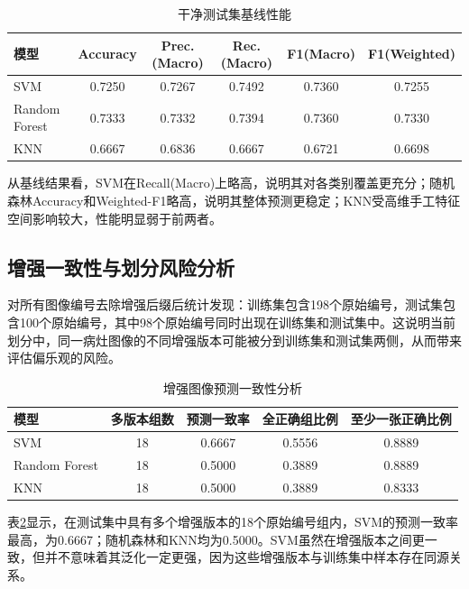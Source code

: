 \documentclass[12pt,a4paper]{ctexart}
\begin{document}
\begin{table}[H]
\centering
\caption{干净测试集基线性能}
\label{tab:baseline}
\begin{tabular}{lccccc}
\toprule
\textbf{模型} & \textbf{Accuracy} & \textbf{Prec.(Macro)} & \textbf{Rec.(Macro)} & \textbf{F1(Macro)} & \textbf{F1(Weighted)} \\
\midrule
SVM           & 0.7250 & 0.7267 & 0.7492 & 0.7360 & 0.7255 \\
Random Forest & 0.7333 & 0.7332 & 0.7394 & 0.7360 & 0.7330 \\
KNN           & 0.6667 & 0.6836 & 0.6667 & 0.6721 & 0.6698 \\
\bottomrule
\end{tabular}
\end{table}

从基线结果看，SVM在Recall(Macro)上略高，说明其对各类别覆盖更充分；随机森林Accuracy和Weighted-F1略高，说明其整体预测更稳定；KNN受高维手工特征空间影响较大，性能明显弱于前两者。

\subsection{增强一致性与划分风险分析}
对所有图像编号去除增强后缀后统计发现：训练集包含198个原始编号，测试集包含100个原始编号，其中98个原始编号同时出现在训练集和测试集中。这说明当前划分中，同一病灶图像的不同增强版本可能被分到训练集和测试集两侧，从而带来评估偏乐观的风险。

\begin{table}[H]
\centering
\caption{增强图像预测一致性分析}
\label{tab:aug_consistency}
\begin{tabular}{lcccc}
\toprule
\textbf{模型} & \textbf{多版本组数} & \textbf{预测一致率} & \textbf{全正确组比例} & \textbf{至少一张正确比例} \\
\midrule
SVM           & 18 & 0.6667 & 0.5556 & 0.8889 \\
Random Forest & 18 & 0.5000 & 0.3889 & 0.8889 \\
KNN           & 18 & 0.5000 & 0.3889 & 0.8333 \\
\bottomrule
\end{tabular}
\end{table}

表\ref{tab:aug_consistency}显示，在测试集中具有多个增强版本的18个原始编号组内，SVM的预测一致率最高，为0.6667；随机森林和KNN均为0.5000。SVM虽然在增强版本之间更一致，但并不意味着其泛化一定更强，因为这些增强版本与训练集中样本存在同源关系。
\end{document}
